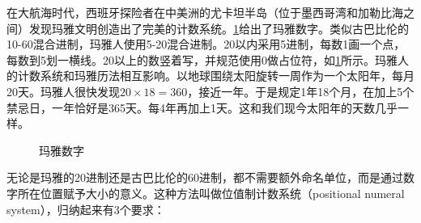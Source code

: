 \documentclass[b5paper]{ctexart}
\begin{document}
在大航海时代，西班牙探险者在中美洲的尤卡坦半岛（位于墨西哥湾和加勒比海之间）发现玛雅文明创造出了完美的计数系统。\cref{fig:maya-numerals}给出了玛雅数字。类似古巴比伦的10-60混合进制，玛雅人使用5-20混合进制。20以内采用5进制，每数1画一个点，每数到5划一横线。20以上的数竖着写，并规范使用0做占位符，如\cref{fig:maya-numerals}所示。玛雅人的计数系统和玛雅历法相互影响。以地球围绕太阳旋转一周作为一个太阳年，每月20天。玛雅人很快发现$20 \times 18 = 360$，接近一年。于是规定1年18个月，在加上5个禁忌日，一年恰好是365天。每4年再加上1天。这和我们现今太阳年的天数几乎一样。

\begin{figure}[htbp]
 \centering
 \caption{玛雅数字}
 \label{fig:maya-numerals}
\end{figure}

无论是玛雅的20进制还是古巴比伦的60进制，都不需要额外命名单位，而是通过数字所在位置赋予大小的意义。这种方法叫做位值制计数系统（positional numeral system），归纳起来有3个要求：
\end{document}
